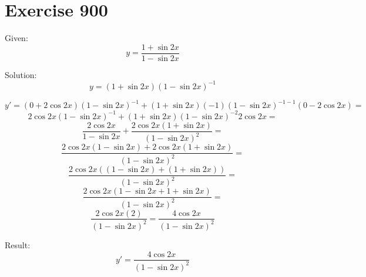 \documentclass[a4paper, 10pt]{scrartcl}
\begin{document}
\section{Exercise 900}

Given:
\[
y = \frac{1 + \sin{2x}}{1 - \sin{2x}}
\]

Solution:
\[
y = (1 + \sin{2x})(1 - \sin{2x})^{-1}
\]

\[
y' = (0 + 2\cos{2x})(1 - \sin{2x})^{-1} + (1 + \sin{2x})(-1)(1 - \sin{2x})^{-1 - 1}(0 - 2\cos{2x}) =
\]
\[
2\cos{2x}(1 - \sin{2x})^{-1} + (1 + \sin{2x})(1 - \sin{2x})^{-2}2\cos{2x} =
\]
\[
\frac{2\cos{2x}}{1 - \sin{2x}} + \frac{2\cos{2x}(1 + \sin{2x})}{(1 - \sin{2x})^{2}} =
\]
\[
\frac{2\cos{2x}(1 - \sin{2x}) + 2\cos{2x}(1 + \sin{2x})}{(1 - \sin{2x})^{2}} =
\]
\[
\frac{2\cos{2x}((1 - \sin{2x}) + (1 + \sin{2x}))}{(1 - \sin{2x})^{2}} =
\]
\[
\frac{2\cos{2x}(1 - \sin{2x} + 1 + \sin{2x})}{(1 - \sin{2x})^{2}} =
\]
\[
\frac{2\cos{2x}(2)}{(1 - \sin{2x})^{2}} = \frac{4\cos{2x}}{(1 - \sin{2x})^{2}}
\]

Result:
\[
y' = \frac{4\cos{2x}}{(1 - \sin{2x})^{2}}
\]
\end{document}
